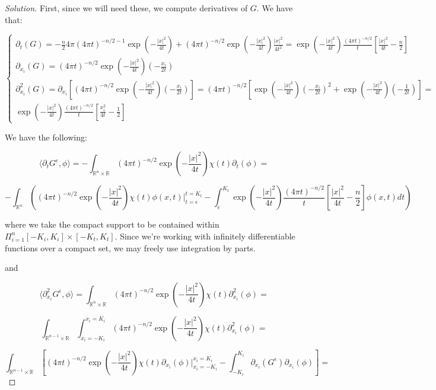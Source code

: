 \documentclass[10pt]{article}
\begin{document}
\begin{proof}[Solution]
First, since we will need these, we compute derivatives of $G$. We have that:

$$ \begin{cases} \partial_t(G) = -\frac{n}{2} 4\pi (4 \pi t)^{-n/2 - 1} \exp\left(-\frac{| x|^2}{4t}\right) + (4\pi t)^{-n/2}\exp\left(-\frac{| x|^2}{4t}\right) \frac{|x|^2}{4t^2} = \exp\left(-\frac{| x|^2}{4t}\right) \frac{(4\pi t)^{-n/2}}{t} \left[ \frac{|x|^2}{4t} - \frac{n}{2} \right] \\ \partial_{x_i}(G) = (4\pi t)^{-n/2}\exp\left(-\frac{| x|^2}{4t}\right)\left( -\frac{x_i}{2t}\right) \\ \partial_{x_i}^2(G) = \partial_{x_i}\left[(4\pi t)^{-n/2}\exp\left(-\frac{| x|^2}{4t}\right)\left( -\frac{x_i}{2t}\right) \right] = (4\pi t)^{-n/2} \left[  \exp\left(-\frac{| x|^2}{4t}\right)\left( -\frac{x_i}{2t}\right)^2 +\exp\left(-\frac{| x|^2}{4t}\right)\left( -\frac{1}{2t}\right) \right] = 
\\ \exp\left(-\frac{| x|^2}{4t}\right) \frac{(4\pi t)^{-n/2}}{t}  \left[ \frac{x_i^2}{4t} - \frac{1}{2} \right] \end{cases}$$

We have the following:

$$ \langle \partial_t G^\epsilon, \phi \rangle = - \int_{\mathbb{R}^n \times \mathbb{R}} (4\pi t)^{-n/2} \exp\left(-\frac{| x|^2}{4t}\right) \chi(t) \partial_t(\phi) = $$

$$- \int_{\mathbb{R}^n} \left( (4\pi t)^{-n/2} \exp\left(-\frac{| x|^2}{4t}\right) \chi(t) \phi(x,t) \bigg|_{t=\epsilon}^{t=K_t} - \int_{\epsilon}^{K_t} \exp\left(-\frac{| x|^2}{4t}\right) \frac{(4\pi t)^{-n/2}}{t} \left[ \frac{|x|^2}{4t} - \frac{n}{2} \right] \phi(x,t) dt  \right)$$

where we take the compact support to be contained within $\Pi_{i=1}^n [-K_{i}, K_{i}] \times [-K_t, K_t] $. Since we’re working with infinitely differentiable functions over a compact set, we may freely use integration by parts.

and

$$ \langle \partial_{x_i}^2 G^\epsilon, \phi \rangle = \int_{\mathbb{R}^n \times \mathbb{R}} (4\pi t)^{-n/2} \exp\left(-\frac{| x|^2}{4t}\right) \chi(t) \partial_{x_i}^2(\phi) = $$

$$ \int_{\mathbb{R}^{n-1} \times \mathbb{R}} \int_{x_i = -K_i}^{x_i = K_i} (4\pi t)^{-n/2} \exp\left(-\frac{| x|^2}{4t}\right) \chi(t) \partial_{x_i}^2(\phi)  = $$

$$ \int_{\mathbb{R}^{n-1} \times \mathbb{R}}  \left[ (4\pi t)^{-n/2} \exp\left(-\frac{| x|^2}{4t}\right) \chi(t) \partial_{x_i}(\phi) \bigg|_{x_i= -K_i}^{x_i = K_i}  - \int_{-K_i}^{K_i} \partial_{x_i}(G^\epsilon) \partial_{x_i}(\phi) \right] = $$


\end{proof}
\end{document}
